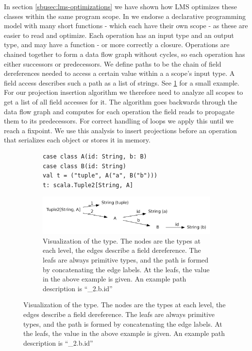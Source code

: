 In section \ref{sbusec:lms-optimizations} we have shown how LMS optimizes these classes within the same program scope. In \tool we endorse a declarative programming model with many short functions - which each have their own scope - as these are easier to read and optimize. Each operation has an input type and an output type, and may have a function - or more correctly a closure. Operations are chained together to form a data flow graph without cycles, so each operation has either successors or predecessors. We define paths to be the chain of field dereferences needed to access a certain value within a a scope's input type. A field access describes such a path as a list of strings. See \ref{fig:type_tree} for a small example. \\
For our projection insertion algorithm we therefore need to analyze all scopes to get a list of all field accesses for it. The algorithm goes backwards through the data flow graph and computes for each operation the field reads to propagate them to its predecessors. For correct handling of loops we apply this until we reach a fixpoint. We use this analysis to insert projections before an operation that serializes each object or stores it in memory.
\begin{figure}
\begin{subfigure}[b]{.5\linewidth}
\begin{lstlisting}[name=code, caption=Types for field access example]
case class A(id: String, b: B)
case class B(id: String)  
val t = ("tuple", A("a", B("b"))) 
t: scala.Tuple2[String, A]
\end{lstlisting}
\centering
\includegraphics[width=\linewidth]{dot/access.png}
\caption{Visualization of the type. The nodes are the types at each level, the edges describe a field dereference. The leafs are always primitive types, and the path is formed by concatenating the edge labels. At the leafs, the value in the above example is given. An example path description is ``\_2.b.id''}
\end{subfigure}
\label{fig:type_tree}
\end{figure}
\\
